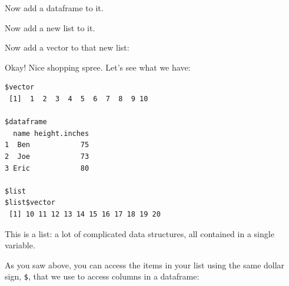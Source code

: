 \documentclass[
]{book}
\newenvironment{Shaded}{\begin{snugshade}}{\end{snugshade}}
\newcommand{\DataTypeTok}[1]{\textcolor[rgb]{0.13,0.29,0.53}{#1}}
\newcommand{\DecValTok}[1]{\textcolor[rgb]{0.00,0.00,0.81}{#1}}
\newcommand{\KeywordTok}[1]{\textcolor[rgb]{0.13,0.29,0.53}{\textbf{#1}}}
\newcommand{\NormalTok}[1]{#1}
\newcommand{\OperatorTok}[1]{\textcolor[rgb]{0.81,0.36,0.00}{\textbf{#1}}}
\newcommand{\StringTok}[1]{\textcolor[rgb]{0.31,0.60,0.02}{#1}}
\begin{document}
Now add a dataframe to it.

\begin{Shaded}
\end{Shaded}

Now add a new list to it.

\begin{Shaded}
\end{Shaded}

Now add a vector to that new list:

\begin{Shaded}
\end{Shaded}

Okay! Nice shopping spree. Let's see what we have:

\begin{verbatim}
$vector
 [1]  1  2  3  4  5  6  7  8  9 10

$dataframe
  name height.inches
1  Ben            75
2  Joe            73
3 Eric            80

$list
$list$vector
 [1] 10 11 12 13 14 15 16 17 18 19 20
\end{verbatim}

This is a list: a lot of complicated data structures, all contained in a single variable.

As you saw above, you can access the items in your list using the same dollar sign, \texttt{\$}, that we use to access columns in a dataframe:

\begin{Shaded}
\end{Shaded}
\end{document}
